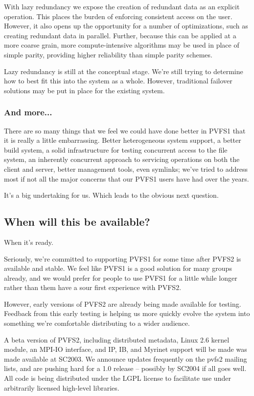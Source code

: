 With lazy redundancy we expose the creation of redundant data as an explicit
operation.  This places the burden of enforcing consistent access on the
user.  However, it also opens up the opportunity for a number of
optimizations, such as creating redundant data in parallel.  Further, because
this can be applied at a more coarse grain, more compute-intensive algorithms
may be used in place of simple parity, providing higher reliability than
simple parity schemes.

Lazy redundancy is still at the conceptual stage.  We're still trying to
determine how to best fit this into the system as a whole.  However,
traditional failover solutions may be put in place for the existing system.

\subsubsection{And more...}

There are so many things that we feel we could have done better in PVFS1 that
it is really a little embarrassing.  Better heterogeneous system support, a
better build system, a solid infrastructure for testing concurrent access to
the file system, an inherently concurrent approach to servicing operations on
both the client and server, better management tools, even symlinks; we've
tried to address most if not all the major concerns that our PVFS1 users have
had over the years.

It's a big undertaking for us.  Which leads to the obvious next question.

\subsection{When will this be available?}

When it's ready.

Seriously, we're committed to supporting PVFS1 for some time after PVFS2 is
available and stable.  We feel like PVFS1 is a good solution for many groups
already, and we would prefer for people to use PVFS1 for a little while longer
rather than them have a sour first experience with PVFS2.

However, early versions of PVFS2 are already being made available for
testing.  Feedback from this early testing is helping us more quickly evolve
the system into something we're comfortable distributing to a wider audience.

A beta version of PVFS2, including distributed metadata, Linux 2.6 kernel
module, an MPI-IO interface, and IP, IB, and Myrinet support will be made
was made available at SC2003.  We announce updates frequently on the pvfs2
mailing lists, and are pushing hard for a 1.0 release -- possibly by
SC2004 if all goes well.  All code is being distributed under the LGPL
license to facilitate use under arbitrarily licensed high-level libraries.
